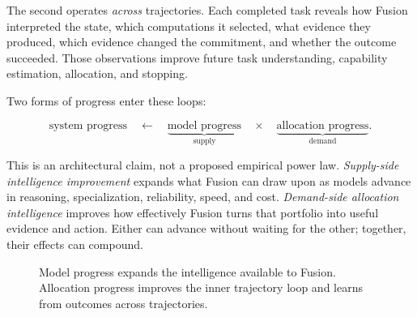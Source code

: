 The second operates \emph{across} trajectories. Each completed task reveals
how Fusion interpreted the state, which computations it selected, what evidence
they produced, which evidence changed the commitment, and whether the outcome
succeeded. Those observations improve future task understanding, capability
estimation, allocation, and stopping.

Two forms of progress enter these loops:

\begin{equation}
  \text{system progress}
  \quad\longleftarrow\quad
  \underbrace{\text{model progress}}_{\text{supply}}
  \quad\times\quad
  \underbrace{\text{allocation progress}}_{\text{demand}}.
\end{equation}

This is an architectural claim, not a proposed empirical power law.
\emph{Supply-side intelligence improvement} expands what Fusion can draw upon
as models advance in reasoning, specialization, reliability, speed, and cost.
\emph{Demand-side allocation intelligence} improves how effectively Fusion
turns that portfolio into useful evidence and action. Either can advance
without waiting for the other; together, their effects can compound.

\begin{figure}[H]
\centering
{}
\caption{Model progress expands the intelligence available to Fusion.
Allocation progress improves the inner trajectory loop and learns from outcomes
across trajectories.}
\label{fig:compounding-loops}
\end{figure}

